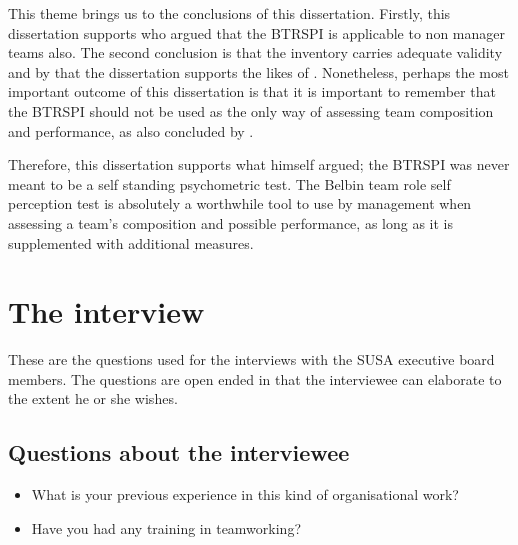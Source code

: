 \documentclass[a4paper,12pt,titlepage]{report}
\begin{document}
  This theme brings us to the conclusions of this dissertation. Firstly, this
  dissertation supports \citet{sfthwm3} who argued that
  the BTRSPI is applicable to non manager teams also.
  The second conclusion is that the inventory carries adequate validity and by that
  the dissertation supports the likes of \citet{bwmg}.
  Nonetheless, perhaps the most important
  outcome of this dissertation is that it is important to remember that the
  BTRSPI should not be used as the only way of assessing team
  composition and performance, as also concluded by \citet{sfwmgs}.

  Therefore, this dissertation supports what \citet{rmb3} himself argued;
  the BTRSPI was never meant to be a self standing psychometric test.
  The Belbin team role self perception test is absolutely
  a worthwhile tool to use by management
  when assessing a team's composition and possible performance, as
  long as it is supplemented with additional measures.
   
  \newpage
  \appendix
  \setlength{\baselineskip}{1.3em}

  \chapter{The interview \label{interview}}
  These are the questions used for the interviews with the SUSA executive
  board members. The questions are open ended in that the interviewee
  can elaborate to the extent he or she wishes.

  \section*{Questions about the interviewee}
  \begin{itemize}
  \item What is your previous experience in this kind of organisational work?
  \item Have you had any training in teamworking?
  \end{itemize}
\end{document}
